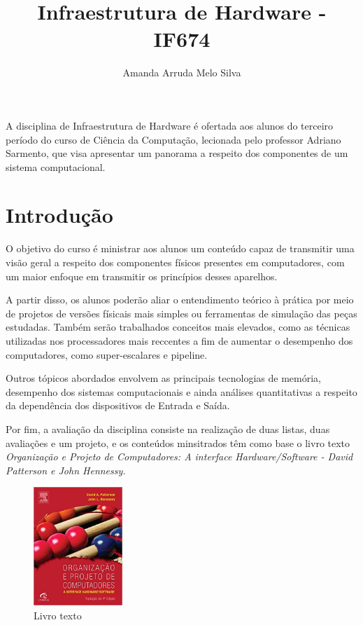 \documentclass[12pt]{article}
\title{Infraestrutura de Hardware - IF674}
\author{Amanda Arruda Melo Silva\inst{1}}
\begin{document}
 
	
	\maketitle
	
	\begin{resumo} 
	    A disciplina de Infraestrutura de Hardware é ofertada aos alunos do terceiro período do curso de Ciência da Computação, lecionada pelo professor Adriano Sarmento, que visa apresentar um panorama a respeito dos componentes de um sistema computacional.

	\end{resumo}
	
	\section{Introdução}
	\label{sec:introducao}
	
        O objetivo do curso é ministrar aos alunos um conteúdo capaz de transmitir uma visão geral a respeito dos componentes físicos presentes em computadores, com um maior enfoque em transmitir os princípios desses aparelhos.
    	
    	A partir disso, os alunos poderão aliar o entendimento teórico à prática por meio de projetos de versões físicais mais simples ou ferramentas de simulação das peças estudadas. Também serão trabalhados conceitos mais elevados, como as técnicas utilizadas nos processadores mais reccentes a fim de aumentar o desempenho dos computadores, como super-escalares e pipeline.
    	
    	Outros tópicos abordados envolvem as principais tecnologias de memória, desempenho dos sistemas computacionais e ainda análises quantitativas a respeito da dependência dos dispositivos de Entrada e Saída.
    	
    	Por fim, a avaliação da disciplina consiste na realização de duas listas, duas avaliações e um projeto, e os conteúdos minsitrados têm como base o livro texto \emph{Organização e Projeto de Computadores: A interface Hardware/Software - David Patterson e John Hennessy.}
    	
        \begin{figure}[!h]
         \centering
         \includegraphics[width=0.3\textwidth]{figures/livro.jpg}
         \caption{Livro texto}
         \label{fig:livro}
        \end{figure}
\end{document}
